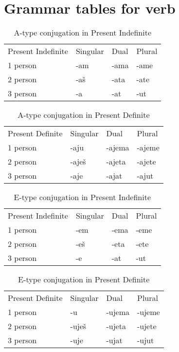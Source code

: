 \section{Grammar tables for verb}

\begin{table}[!htpb]
	\caption{A-type conjugation in Present Indefinite}
	\begin{tabular}{llll}
		Present Indefinite & Singular & Dual & Plural \\
		1 person & -am & -ama & -ame \\
		2 person & -aš & -ata & -ate \\
		3 person & -a & -at & -ut
	\end{tabular}
\end{table}

\begin{table}[!htpb]
	\caption{A-type conjugation in Present Definite}
	\begin{tabular}{llll}
		Present Definite & Singular & Dual & Plural \\
		1 person & -aju & -ajema & -ajeme \\
		2 person & -aješ & -ajeta & -ajete \\
		3 person & -aje & -ajat & -ajut
	\end{tabular}
\end{table}

\begin{table}[!htpb]
	\caption{E-type conjugation in Present Indefinite}
	\begin{tabular}{llll}
		Present Indefinite & Singular & Dual & Plural \\
		1 person & -em & -ema & -eme \\
		2 person & -eš & -eta & -ete \\
		3 person & -e & -at & -ut
	\end{tabular}
\end{table}


\begin{table}[!htpb]
	\caption{E-type conjugation in Present Definite}
	\begin{tabular}{llll}
		Present Definite & Singular & Dual & Plural \\
		1 person & -u & -ujema & -ujeme \\
		2 person & -uješ & -ujeta & -ujete \\
		3 person & -uje & -ujat & -ujut
	\end{tabular}
\end{table}


